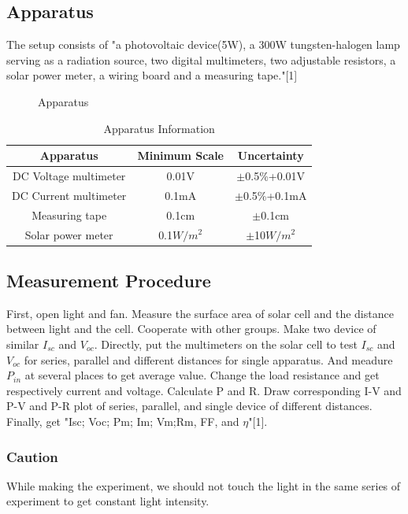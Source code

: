 \documentclass[12pt,a4paper]{article}
\begin{document}
\subsection{Apparatus}
The setup consists of "a photovoltaic device(5W), a 300W tungsten-halogen lamp serving as a radiation source, two digital multimeters, two adjustable resistors, a solar power meter, a wiring board and a measuring tape."[1]
\begin{figure}[H]
    \centering
    \caption{Apparatus}
\end{figure}
\begin{table}[H]
    \centering
    \begin{tabular}{|c|c|c|}
    \hline
    \textbf{Apparatus} & \textbf{Minimum Scale} &\textbf{Uncertainty} \\ \hline
    DC Voltage multimeter & 0.01V & $\pm$0.5\%+0.01V \\ \hline
    DC Current multimeter & 0.1mA & $\pm$0.5\%+0.1mA \\ \hline
    Measuring tape & 0.1cm & $\pm$0.1cm \\ \hline
    Solar power meter & 0.1$W/m^2$ & $\pm$10$W/m^2$ \\ \hline
    \end{tabular}
    \caption{Apparatus Information}
    \label{apparatus}
\end{table} 

\subsection{Measurement Procedure}
First, open light and fan. Measure the surface area of solar cell and the distance between light and the cell. Cooperate with other groups. Make two device of similar $I_{sc}$ and $V_{oc}$. Directly, put the multimeters on the solar cell to test $I_{sc}$ and $V_{oc}$ for series, parallel and different distances for single apparatus. And meadure $P_{in}$ at several places to get average value. Change the load resistance and get respectively current and voltage. Calculate P and R. Draw corresponding I-V and P-V and P-R plot of series, parallel, and single device of different distances. Finally, get "Isc; Voc; Pm; Im; Vm;Rm, FF, and $\eta$"[1]. 

\subsubsection{Caution}
While making the experiment, we should not touch the light in the same series of experiment to get constant light intensity.
\end{document}
